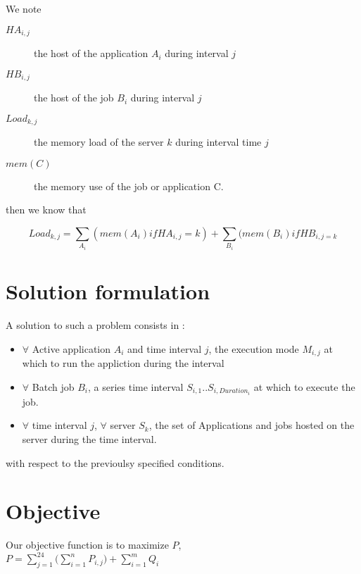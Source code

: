 \documentclass[a4paper]{article}
\newcommand\gilles[1]{\textcolor{red}{#1}}
\begin{document}
We note
\begin{description}
\item[$HA_{i,j}$] the host of the application $A_i$ during interval $j$
\item[$HB_{i,j}$] the host of the job $B_i$ during interval $j$
\item[$Load_{k,j}$] the memory load of the server $k$ during interval time $j$
\item[$mem(C)$] the memory use of the job or application C.
\end{description}

then we know that

\begin{equation}
Load_{k,j} = \sum_{A_i}(mem(A_i) if HA_{i,j}=k) + \sum_{B_i}(mem(B_i) if HB_{i,j=k}
\end{equation}

\section{Solution formulation}

A solution to such a problem consists in :
\begin{itemize}
\item $\forall$ Active application $A_i$ and time interval $j$, the execution mode $M_{i,j}$ at which to run the appliction during the interval
\item $\forall$ Batch job $B_i$, a series time interval $S_{i,1}..S_{i, Duration_i}$ at which to execute the job.
\item $\forall$ time interval $j$, $\forall$ server $S_k $, the set of Applications and jobs hosted on the server during the time interval.
\end{itemize}
with respect to the previoulsy specified conditions.

\section{Objective}
Our objective function is to maximize $P$,\\
$P= \sum_{j=1}^{24} \bigg( \sum_{i=1}^{n} {P_{i,j}}\bigg)  + \sum_{i=1}^{m} Q_i$

\end{document}
